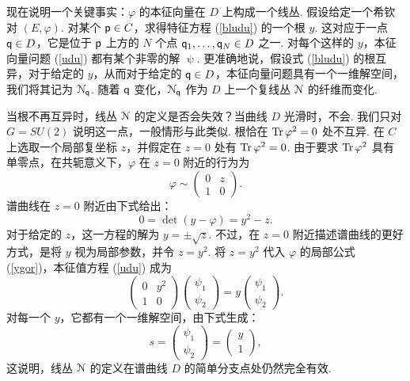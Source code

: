 现在说明一个关键事实：$\varphi$ 的本征向量在 $D$ 上构成一个线丛. 假设给定一个希钦对 $(E,\varphi)$. 对某个 ${\sf p}\in C$，求得特征方程 (\ref{bludu}) 的一个根 $y$. 这对应于一点 ${\sf q}\in D$，它是位于 ${\sf p}$ 上方的 $N$ 个点 ${\sf q}_1,\dots, {\sf q}_N\in D$ 之一. 对每个这样的 $y$，本征向量问题 (\ref{udu}) 都有某个非零的解 $\uppsi$. 更准确地说，假设式 (\ref{bludu}) 的根互异，对于给定的 $y$，从而对于给定的 ${\sf q}\in D$，本征向量问题具有一个一维解空间，我们将其记为 ${\cal N}_{\sf q}$. 随着 ${\sf q}$ 变化，${\cal N}_{\sf q}$ 作为 $D$ 上一个复线丛 ${\cal N}$ 的纤维而变化.

当根不再互异时，线丛 ${\cal N}$ 的定义是否会失效？当曲线 $D$ 光滑时，不会. 我们只对 $G=SU(2)$ 说明这一点，一般情形与此类似. 根恰在 ${\rm Tr}\,\varphi^2=0$ 处不互异. 在 $C$ 上选取一个局部复坐标 $z$，并假定在 $z=0$ 处有 ${\rm Tr}\,\varphi^2=0$. 由于要求 ${\rm Tr}\,\varphi^2$ 具有单零点，在共轭意义下，$\varphi$ 在 $z=0$ 附近的行为为
\begin{equation}
\label{ygor}
\varphi\sim
\begin{pmatrix}0 & z\\ 1 & 0\end{pmatrix}.
\end{equation}
谱曲线在 $z=0$ 附近由下式给出：
\begin{equation}
\label{jygor}
0=\det(y-\varphi)=y^2-z.
\end{equation}
对于给定的 $z$，这一方程的解为 $y=\pm\sqrt{z}$. 不过，在 $z=0$ 附近描述谱曲线的更好方式，是将 $y$ 视为局部参数，并令 $z=y^2$. 将 $z=y^2$ 代入 $\varphi$ 的局部公式 (\ref{ygor})，本征值方程 (\ref{udu}) 成为
\begin{equation}
\label{zygor}\begin{pmatrix}0 &
y^2\\ 1 & 0\end{pmatrix}\begin{pmatrix}\psi_1
\\ \psi_2\end{pmatrix}=y\begin{pmatrix}\psi_1 \\ \psi_2\end{pmatrix}.
\end{equation}
对每一个 $y$，它都有一个一维解空间，由下式生成：
\begin{equation}
\label{calleds}
s=\begin{pmatrix}\psi_1
\\ \psi_2\end{pmatrix}=\begin{pmatrix}y \\ 1\end{pmatrix},
\end{equation}
这说明，线丛 ${\cal N}$ 的定义在谱曲线 $D$ 的简单分支点处仍然完全有效.

